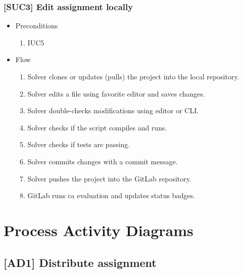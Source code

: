 \subsubsection{{[}SUC3{]} Edit assignment locally}

\begin{itemize}
\item
  {Preconditions}
    \begin{enumerate}
    \item
      {IUC5}
    \end{enumerate}
\end{itemize}

\begin{itemize}
\item
  {Flow}
    \begin{enumerate}
    \item
      {Solver clones or updates (pulls) the project into the local repository.}
    \item
      {Solver edits a file using favorite editor and saves changes.}
    \item
      {Solver double-checks modifications using editor or CLI.}
    \item
      {Solver checks if the script compiles and runs.}
    \item
      {Solver checks if tests are passing.}
    \item
      {Solver commits changes with a commit message.}
    \item
      {Solver pushes the project into the GitLab repository.}
    \item
      {GitLab runs ca evaluation and updates status badges.}
    \end{enumerate}
\end{itemize}

\section{Process Activity Diagrams} \label{sec:ad}

\subsection{{[}AD1{]} Distribute assignment} \label{ssec: ad1}

